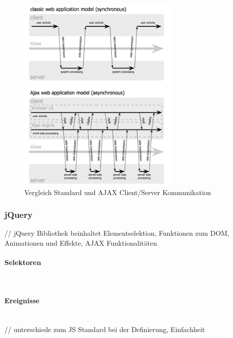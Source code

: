 \begin{figure}[htb]
  \centering
  \includegraphics[width=0.7\textwidth]{abb/ajax}
  \caption[Vergleich Standard und AJAX Client/Server Kommunikation]{Vergleich Standard und AJAX Client/Server Kommunikation\footnotemark}
  \label{fig:ajax}
\end{figure}

\subsubsection{jQuery}
// jQuery Bibliothek beinhaltet Elementselektion, Funktionen zum DOM, Animationen und Effekte, AJAX Funktionalitäten\\

\paragraph{Selektoren}$\;$ \\

\paragraph{Ereignisse}$\;$ \\
// unterschiede zum JS Standard bei der Definierung, Einfachheit\\

